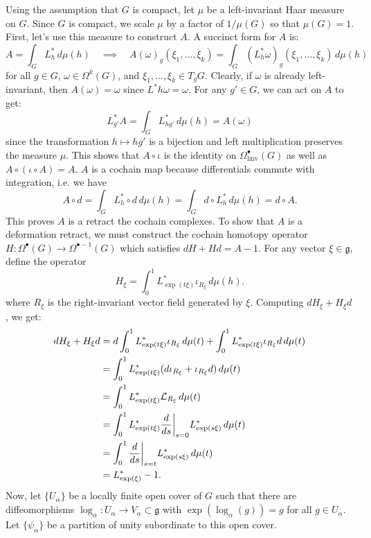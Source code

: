 \documentclass{../../templates/lkx_pset}
\begin{document}
\begin{parts}
	Using the assumption that $G$ is compact, let $\mu$ be a left-invariant Haar measure on $G$. Since $G$ is compact, we scale $\mu$ by a factor of $1/\mu(G)$ so that $\mu(G)=1$.
	First, let's use this measure to construct $A$. A succinct form for $A$ is:
	\[
		A = \int_G L^*_h\,d\mu(h)\quad\implies\quad A(\omega)_g(\xi_1, \ldots, \xi_k) = \int_G (L^*_h \omega)_g ( \xi_1, \ldots, \xi_k)\,d\mu(h)
	\]
	for all $g\in G$, $\omega\in \Omega^k(G)$, and $\xi_1,\ldots, \xi_k\in T_g G$.
	Clearly, if $\omega$ is already left-invariant, then $A(\omega) = \omega$ since $L^*h\omega = \omega$. For any $g'\in G$, we can act on $A$ to get:
	\[
		L_{g'}^* A  = \int_G L^*_{hg'} \,d\mu(h) = A(\omega)
	\]
	since the transformation $h \mapsto hg'$ is a bijection and left multiplication preserves the measure $\mu$. This shows that $A\circ \iota$ is the identity on $\Omega^\bullet_{\textrm{linv}}(G)$ as well as $A\circ (\iota\circ A)=A$. $A$ is a cochain map because differentials commute with integration, i.e. we have
	\[
		A\circ d = \int_G L_h^* \circ d\,d\mu(h) = \int_G d\circ L_h^*\,d\mu(h) = d\circ A.
	\]
	This proves $A$ is a retract the cochain complexes. To show that $A$ is a deformation retract, we must construct the cochain homotopy operator $H : \Omega^\bullet(G) \to \Omega^{\bullet-1}(G)$ which satisfies $dH + Hd=A-1$. For any vector $\xi \in \mathfrak{g}$, define the operator
	\[
		H_\xi = \int_0^1 L^*_{\exp(t\xi)} \iota_{R_\xi} \,d\mu(h).
	\]
	where $R_\xi$ is the right-invariant vector field generated by $\xi$. Computing $dH_\xi + H_\xi d$, we get:
	\[
		\begin{aligned}
			dH_\xi + H_\xi d & = d\int_0^1 L_{\exp(t\xi)}^*\iota_{R_\xi}\,d\mu(t) + \int_0^1 L_{\exp(t\xi)}^*\iota_{R_\xi} d\,d\mu(t) \\
			                 & = \int_0^1 L_{\exp(t\xi)}^*(d\iota_{R_\xi} + \iota_{R_\xi} d)\,d\mu(t)                                 \\
			                 & = \int_0^1 L_{\exp(t\xi)}^* \mathcal{L}_{R_\xi}\,d\mu(t)\\
			                 & = \int_0^1 L_{\exp(t\xi)}^* \restr{\frac{d}{ds}}{s=0} L^*_{\exp(s\xi)} \,d\mu(t)\\
			                 & = \int_0^1 \restr{\frac{d}{ds}}{s=t} L^*_{\exp(s\xi)} \,d\mu(t)\\
			                 &= L^*_{\exp(\xi)} - 1.
		\end{aligned}
	\]
	Now, let $\{U_\alpha\}$ be a locally finite open cover of $G$ such that there are diffeomorphisms $\log_\alpha : U_\alpha \to V_\alpha \subset \mathfrak{g}$ with $\exp(\log_\alpha(g))=g$ for all $g\in U_\alpha$. Let $\{\psi_\alpha\}$ be a partition of unity subordinate to this open cover. 


\end{parts}
\end{document}
